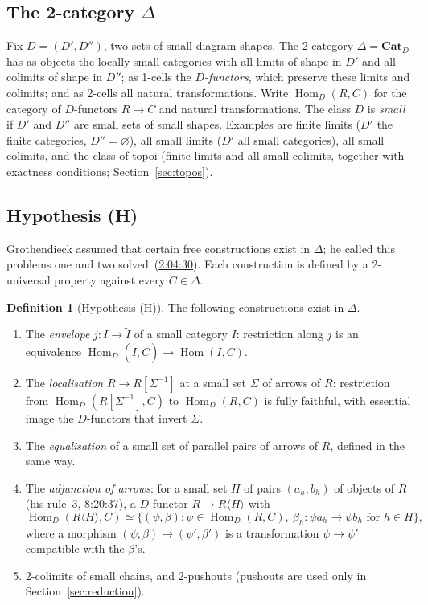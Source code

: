 \documentclass[11pt,a4paper]{amsart}
\theoremstyle{definition}
\newtheorem{definition}[theorem]{Definition}
\theoremstyle{remark}
\newcommand{\q}[1]{\guillemotleft\,#1\,\guillemotright}
\newcommand{\ts}[3]{\href{https://www.youtube.com/watch?v=#1&t=#2}{#3}}
\newcommand{\Cat}{\mathbf{Cat}}
\newcommand{\Hom}{\operatorname{Hom}}
\begin{document}
\subsection{The 2-category $\Delta$}
Fix $D=(D',D'')$, two sets of small diagram shapes. The 2-category $\Delta=\Cat_D$ has as objects the locally small categories with all limits of shape in $D'$ and all colimits of shape in $D''$; as 1-cells the \emph{$D$-functors}, which preserve these limits and colimits; and as 2-cells all natural transformations. Write $\Hom_D(R,C)$ for the category of $D$-functors $R\to C$ and natural transformations. The class $D$ is \emph{small} if $D'$ and $D''$ are small sets of small shapes. Examples are finite limits ($D'$ the finite categories, $D''=\varnothing$), all small limits ($D'$ all small categories), all small colimits, and the class of topoi (finite limits and all small colimits, together with exactness conditions; Section~\ref{sec:topos}).

\subsection{Hypothesis (H)}
Grothendieck assumed that certain free constructions exist in $\Delta$; he called this \q{problems one and two solved} (\ts{4gynb9uTEE4}{2h4m30s}{2:04:30}). Each construction is defined by a 2-universal property against every $C\in\Delta$.

\begin{definition}[Hypothesis (H)]\label{d:H}
The following constructions exist in $\Delta$.
\begin{enumerate}
\item The \emph{envelope} $j\colon I\to\widetilde I$ of a small category $I$: restriction along $j$ is an equivalence $\Hom_D(\widetilde I,C)\to\Hom(I,C)$.
\item The \emph{localisation} $R\to R[\Sigma^{-1}]$ at a small set $\Sigma$ of arrows of $R$: restriction from $\Hom_D(R[\Sigma^{-1}],C)$ to $\Hom_D(R,C)$ is fully faithful, with essential image the $D$-functors that invert $\Sigma$.
\item The \emph{equalisation} of a small set of parallel pairs of arrows of $R$, defined in the same way.
\item The \emph{adjunction of arrows}: for a small set $H$ of pairs $(a_h,b_h)$ of objects of $R$ (his rule~3, \ts{PqCQM3Pcl6Q}{8h20m37s}{8:20:37}), a $D$-functor $R\to R\langle H\rangle$ with
\[\Hom_D(R\langle H\rangle,C)\simeq\{(\psi,\beta):\psi\in\Hom_D(R,C),\ \beta_h\colon\psi a_h\to\psi b_h\text{ for }h\in H\},\]
where a morphism $(\psi,\beta)\to(\psi',\beta')$ is a transformation $\psi\to\psi'$ compatible with the $\beta$'s.
\item 2-colimits of small chains, and 2-pushouts (pushouts are used only in Section~\ref{sec:reduction}).
\end{enumerate}
\end{definition}
\end{document}
